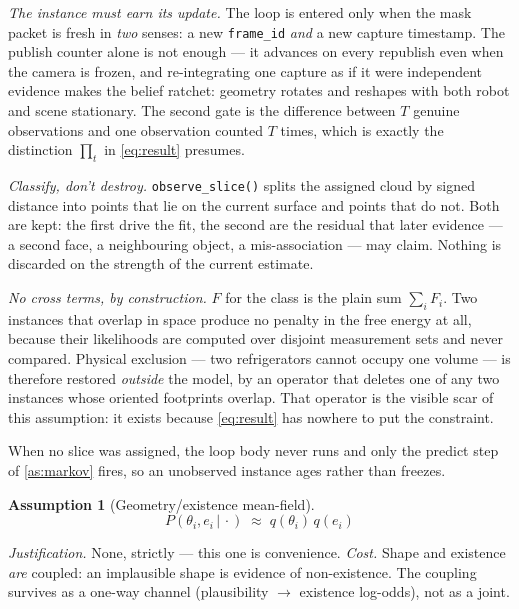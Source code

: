 \documentclass[11pt,a4paper]{report}
\newcommand{\given}{\,|\,}
\theoremstyle{definition}   %
\newtheorem{assumption}{Assumption}
\begin{document}
\emph{The instance must earn its update.} The loop is entered only when the mask packet is fresh
in \emph{two} senses: a new \texttt{frame\_id} \emph{and} a new capture timestamp. The publish
counter alone is not enough --- it advances on every republish even when the camera is frozen, and
re-integrating one capture as if it were independent evidence makes the belief ratchet: geometry
rotates and reshapes with both robot and scene stationary. The second gate is the difference
between $T$ genuine observations and one observation counted $T$ times, which is exactly the
distinction $\prod_t$ in \eqref{eq:result} presumes.

\emph{Classify, don't destroy.} \texttt{observe\_slice()} splits the assigned cloud by signed
distance into points that lie on the current surface and points that do not. Both are kept: the
first drive the fit, the second are the residual that later evidence --- a second face, a
neighbouring object, a mis-association --- may claim. Nothing is discarded on the strength of the
current estimate.

\emph{No cross terms, by construction.} $F$ for the class is the plain sum $\sum_i F_i$. Two
instances that overlap in space produce no penalty in the free energy at all, because their
likelihoods are computed over disjoint measurement sets and never compared. Physical exclusion ---
two refrigerators cannot occupy one volume --- is therefore restored \emph{outside} the model, by
an operator that deletes one of any two instances whose oriented footprints overlap. That operator
is the visible scar of this assumption: it exists because \eqref{eq:result} has nowhere to put the
constraint.

When no slice was assigned, the loop body never runs and only the predict step of
\ref{as:markov} fires, so an unobserved instance ages rather than freezes.

\begin{assumption}[Geometry/existence mean-field]\label{as:geomexist}
\begin{equation}
P(\theta_i,e_i\given\cdot)\;\approx\;q(\theta_i)\,q(e_i)
\end{equation}
\end{assumption}
\noindent\textit{Justification.} None, strictly — this one is convenience. \textit{Cost.} Shape
and existence \emph{are} coupled: an implausible shape is evidence of non-existence. The coupling
survives as a one-way channel (plausibility $\rightarrow$ existence log-odds), not as a joint.
\end{document}
